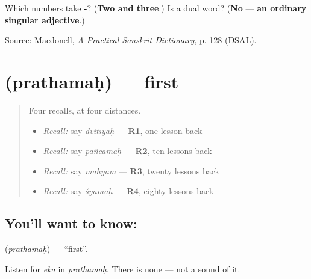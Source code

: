 \begin{tcolorbox}[breakable,colback=teal!4,colframe=teal!35!black,title={Before you move on}]
Which numbers take \textbf{-}? (\textbf{Two and three}.) Is \textbf{} a dual word? (\textbf{No} — \textbf{an ordinary singular adjective}.)

Source: Macdonell, \emph{A Practical Sanskrit Dictionary}, p. 128 (DSAL).
\end{tcolorbox}
\section[\texorpdfstring{\sk{प्रथमः} (prathamaḥ)}{प्रथमः (prathamaḥ)}]{ (prathamaḥ) — first}

\label{lesson:SA-C63-first}



\begin{quote}
Four recalls, at four distances.

\begin{itemize}
\raggedright
  \item \emph{Recall:} say \emph{dvitīyaḥ} — \textbf{R1}, one lesson back
  \item \emph{Recall:} say \emph{pañcamaḥ} — \textbf{R2}, ten lessons back
  \item \emph{Recall:} say \emph{mahyam} — \textbf{R3}, twenty lessons back
  \item \emph{Recall:} say \emph{śyāmaḥ} — \textbf{R4}, eighty lessons back
\end{itemize}
\end{quote}

\subsection*{You'll want to know: }
\textbf{} (\emph{prathamaḥ}) — \textquotedblleft{}first\textquotedblright{}.

Listen for \emph{eka} in \emph{prathamaḥ}. There is none — not a sound of it.

